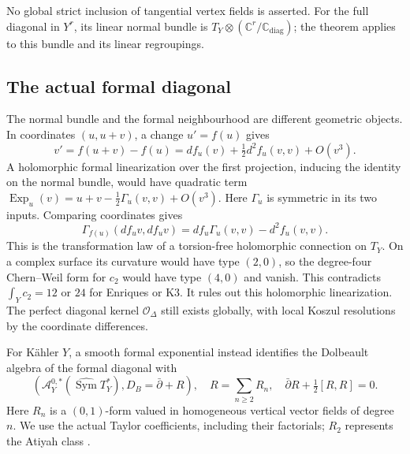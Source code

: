 No global strict inclusion of tangential vertex
fields is asserted. For the full diagonal in
$Y^r$, its linear normal bundle is
$T_Y\otimes(\mathbb C^r/\mathbb C_{\mathrm{diag}})$;
the theorem applies to this bundle and its
linear regroupings.

\subsection{The actual formal diagonal}

The normal bundle and the formal neighbourhood
are different geometric objects. In coordinates
$(u,u+v)$, a change $u'=f(u)$ gives
\[
 v'=f(u+v)-f(u)
    =df_u(v)+\tfrac12d^2f_u(v,v)+O(v^3).
\]
A holomorphic formal linearization over the
first projection, inducing the identity on
the normal bundle, would have quadratic term
$\operatorname{Exp}_u(v)=u+v-\frac12\Gamma_u(v,v)+O(v^3)$.
Here $\Gamma_u$ is symmetric in its two inputs.
Comparing coordinates gives
\[
 \Gamma_{f(u)}(df_uv,df_uv)
     =df_u\Gamma_u(v,v)-d^2f_u(v,v).
\]
This is the transformation law of a torsion-free
holomorphic connection on $T_Y$. On a complex
surface its curvature would have type $(2,0)$,
so the degree-four Chern--Weil form for $c_2$
would have type $(4,0)$ and vanish. This contradicts
$\int_Yc_2=12$ or $24$ for Enriques or K3.
It rules out this holomorphic linearization.
The perfect diagonal kernel $\mathcal O_\Delta$
still exists globally, with local Koszul
resolutions by the coordinate differences.

For K\"ahler $Y$, a smooth formal exponential
instead identifies the Dolbeault algebra of
the formal diagonal with
\begin{equation}\label{cyprim:eq:formal-base}
 \left(\mathcal A_Y^{0,*}
       (\widehat{\operatorname{Sym}}T_Y^*),
       D_B=\bar\partial+R\right),
 \quad R=\sum_{n\ge2}R_n,\quad
 \bar\partial R+\tfrac12[R,R]=0.
\end{equation}
Here $R_n$ is a $(0,1)$-form valued in homogeneous
vertical vector fields of degree $n$. We use
the actual Taylor coefficients, including their
factorials; $R_2$ represents the Atiyah class
\cite[Theorem~3.2]{rewriteYu2015}.

